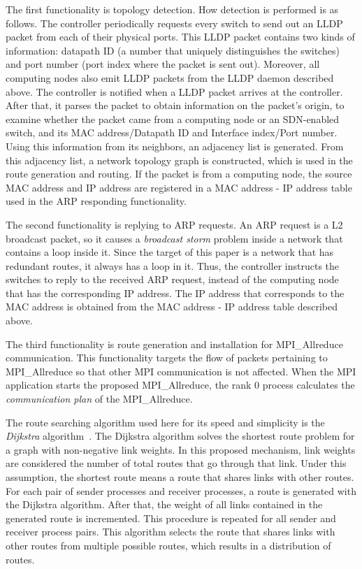 The first functionality is topology detection. How detection is
performed is as follows. The controller periodically requests every
switch to send out an LLDP packet from each of their physical ports.
This LLDP packet contains two kinds of information: datapath ID (a
number that uniquely distinguishes the switches) and port number (port
index where the packet is sent out). Moreover, all computing nodes also
emit LLDP packets from the LLDP daemon described above. The controller
is notified when a LLDP packet arrives at the controller. After that, it
parses the packet to obtain information on the packet's origin, to
examine whether the packet came from a computing node or an SDN-enabled
switch, and its MAC address/Datapath ID and Interface index/Port number.
Using this information from its neighbors, an adjacency list is
generated. From this adjacency list, a network topology graph is
constructed, which is used in the route generation and routing. If the
packet is from a computing node, the source MAC address and IP address
are registered in a MAC address - IP address table used in the ARP
responding functionality.

The second functionality is replying to ARP requests. An ARP request is
a L2 broadcast packet, so it causes a \emph{broadcast storm} problem
inside a network that contains a loop inside it. Since the target of
this paper is a network that has redundant routes, it always has a loop
in it. Thus, the controller instructs the switches to reply to the
received ARP request, instead of the computing node that has the
corresponding IP address. The IP address that corresponds to the MAC
address is obtained from the MAC address - IP address table described
above.

The third functionality is route generation and installation for
MPI\_Allreduce communication. This functionality targets the flow of packets
pertaining to MPI\_Allreduce so that other MPI communication is not affected.
When the MPI application starts the proposed MPI\_Allreduce, the rank 0
process calculates the \emph{communication plan} of the MPI\_Allreduce.

The route searching algorithm used here for its speed and simplicity is
the \emph{Dijkstra} algorithm~\autocite{Dijkstra1959}. The Dijkstra
algorithm solves the shortest route problem for a graph with
non-negative link weights. In this proposed mechanism, link weights are
considered the number of total routes that go through that link. Under
this assumption, the shortest route means a route that shares links with
other routes. For each pair of sender processes and receiver processes,
a route is generated with the Dijkstra algorithm. After that, the weight
of all links contained in the generated route is incremented. This
procedure is repeated for all sender and receiver process pairs. This
algorithm selects the route that shares links with other routes from
multiple possible routes, which results in a distribution of routes.

